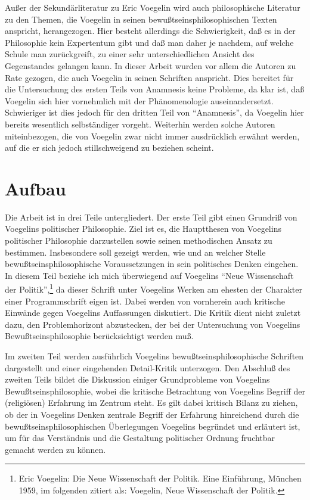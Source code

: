 Außer der Sekundärliteratur zu Eric Voegelin wird auch philosophische
Literatur zu den Themen, die Voegelin in seinen
bewußtseinsphilosophischen Texten anspricht, herangezogen. Hier besteht
allerdings die Schwierigkeit, daß es in der Philosophie kein Expertentum
gibt und daß man daher je nachdem, auf welche Schule man zurückgreift,
zu einer sehr unterschiedlichen Ansicht des Gegenstandes gelangen kann.
In dieser Arbeit wurden vor allem die Autoren zu Rate gezogen, die auch
Voegelin in seinen Schriften anspricht. Dies bereitet für die
Untersuchung des ersten Teils von Anamnesis keine Probleme, da klar ist,
daß Voegelin sich hier vornehmlich mit der Phänomenologie
auseinandersetzt.  Schwieriger ist dies jedoch für den dritten Teil von
"`Anamnesis"', da Voegelin hier bereits wesentlich selbständiger
vorgeht.  Weiterhin werden solche Autoren miteinbezogen, die von
Voegelin zwar nicht immer ausdrücklich erwähnt werden, auf die er sich
jedoch stillschweigend zu beziehen scheint.

\section{Aufbau}

Die Arbeit ist in drei Teile untergliedert. Der erste Teil gibt einen Grundriß
von Voegelins politischer Philosophie. Ziel ist es, die Hauptthesen von
Voegelins politischer Philosophie darzustellen sowie seinen methodischen
Ansatz zu bestimmen. Insbesondere soll gezeigt werden, wie und an welcher
Stelle bewußtseinsphilosophische Voraussetzungen in sein politisches Denken
eingehen. In diesem Teil beziehe ich mich überwiegend auf Voegelins "`Neue
Wissenschaft der Politik"',\footnote{Eric Voegelin: Die Neue Wissenschaft der
  Politik. Eine Einführung, München 1959, im folgenden zitiert als: Voegelin,
  Neue Wissenschaft der Politik.} da dieser Schrift unter Voegelins Werken am
ehesten der Charakter einer Programmschrift eigen ist. Dabei werden von
vornherein auch kritische Einwände gegen Voegelins Auf\/fassungen diskutiert.
Die Kritik dient nicht zuletzt dazu, den Problemhorizont abzustecken, der bei
der Untersuchung von Voegelins Bewußtseinsphilosophie berücksichtigt werden
muß.

Im zweiten Teil werden ausführlich Voegelins bewußtseinsphilosophische
Schriften dargestellt und einer eingehenden Detail-Kritik unterzogen. Den
Abschluß des zweiten Teils bildet die Diskussion einiger Grundprobleme von
Voegelins Bewußtseinsphilosophie, wobei die kritische Betrachtung von
Voegelins Begriff der (religiösen) Erfahrung im Zentrum steht. Es gilt dabei
kritisch Bilanz zu ziehen, ob der in Voegelins Denken zentrale Begriff der
Erfahrung hinreichend durch die bewußtseinsphilosophischen Überlegungen
Voegelins begründet und erläutert ist, um für das Verständnis und die
Gestaltung politischer Ordnung fruchtbar gemacht werden zu können.


